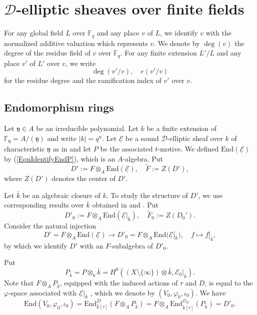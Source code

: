 \documentclass[10pt]{amsart}
\theoremstyle{plain}
\theoremstyle{definition}
\newcommand{\End}{\mathrm{End}}
\newcommand{\cE}{\mathcal{E}}
\newcommand{\cO}{\mathcal{O}}
\newcommand{\ucE}{\underline{\mathcal{E}}}
\newcommand{\bF}{\mathbb{F}}
\newcommand{\sD}{\mathscr{D}}
\newcommand{\fry}{\mathfrak{y}}
\begin{document}
\section{$\sD$-elliptic sheaves over finite fields}\label{SecDEllFinField}

For any global field $L$ over $\bF_q$ and any place $v$ of $L$, we identify $v$ with the normalized additive valuation which represents $v$.
We denote by $\deg(v)$ the degree of the residue field of $v$ over $\bF_q$. 
For any finite extension $L'/L$ and any place $v'$ of $L'$ over $v$, we write
\[
\deg(v'/v),\quad e(v'/v)
\]
for the residue degree and the ramification index of $v'$ over $v$.




\subsection{Endomorphism rings}\label{SubsecEndomRing}

Let $\fry\in A$ be an irreducible polynomial. Let $k$ be a finite extension of $\bF_\fry=A/(\fry)$ and write $|k|=q^n$.
Let $\ucE$ be a sound $\sD$-elliptic sheaf over $k$ of characteristic $\fry$
as in \cite[(9.1)]{LRS} and let $P$ be the associated $t$-motive. 
We defined $\End(\ucE)$ by (\ref{EqnIdentifyEndP}), which is an $A$-algebra. Put
\[
D':=F\otimes_A\End(\ucE),\quad \tilde{F}:=Z(D'),
\]
where $Z(D')$ denotes the center of $D'$.



Let $\bar{k}$ be an algebraic closure of $k$.
To study the structure of $D'$, we use corresponding results over $\bar{k}$ obtained in \cite[\S9]{LRS} and \cite[\S5]{Hau}. Put
\[
D'_0:=F\otimes_A \End(\ucE|_{\bar{k}}),\quad  \tilde{F}_0:=Z(D_0').
\]
Consider the natural injection
\[
D'=F\otimes_A \End(\ucE)\to D'_0=F\otimes_A \End(\ucE|_{\bar{k}}),\quad f\mapsto f|_{\bar{k}},
\]
by which we identify $D'$ with an $F$-subalgebra of $D'_0$. 

Put 
\[
P_{\bar{k}}=P\otimes_k \bar{k}=H^0((X\setminus\{\infty\})\otimes \bar{k},\cE_0|_{\bar{k}}).
\]
Note that $F\otimes_A P_{\bar{k}}$, equipped with the induced actions of $\tau$ and $D$, is equal to
the $\varphi$-space associated with $\ucE|_{\bar{k}}$ \cite[\S9.1]{LRS}, which we denote by $(V_0,\varphi_0,\iota_0)$.
We have
\[
\End(V_0,\varphi_0,\iota_0)=\End_{\bar{k}[\tau]}^D(F\otimes_A P_{\bar{k}})=F\otimes_A\End^{\cO_D}_{\bar{k}[\tau]}(P_{\bar{k}})=D'_0.
\]
\end{document}
